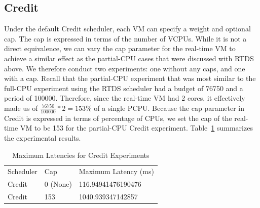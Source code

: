 \documentclass{article}
\begin{document}
\subsection{Credit}
Under the default Credit scheduler, each VM can specify a weight and optional cap. The cap is expressed in terms of the number of VCPUs. While it is not a direct equivalence, we can vary the cap parameter for the real-time VM to achieve a similar effect as the partial-CPU cases that were discussed with RTDS above. We therefore conduct two experiments: one without any caps, and one with a cap. Recall that the partial-CPU experiment that was most similar to the full-CPU experiment using the RTDS scheduler had a budget of 76750 and a period of 100000. Therefore, since the real-time VM had 2 cores, it effectively made us of $\frac{76750}{100000}*2 = 153\%$ of a single PCPU. Because the cap parameter in Credit is expressed in terms of percentage of CPUs, we set the cap of the real-time VM to be 153 for the partial-CPU Credit experiment. Table~\ref{tab:credit} summarizes the experimental results. 
\begin{table}[ht]
 \caption{Maximum Latencies for Credit Experiments}
  \centering
  \begin{tabular}{lll}
    Scheduler & Cap & Maximum Latency (ms)\\
    Credit & 0 (None) & 116.94941476190476\\
    Credit & 153 & 1040.939347142857
  \end{tabular}
  \label{tab:credit}
\end{table}
\end{document}
